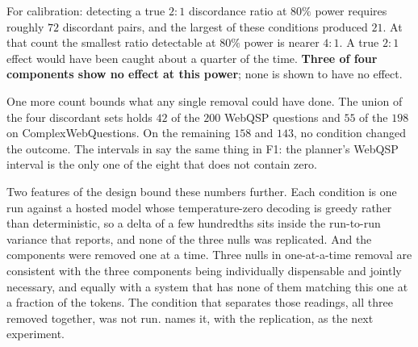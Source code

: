 For calibration: detecting a true $2{:}1$ discordance ratio at $80\%$
power requires roughly $72$ discordant pairs, and the largest of these
conditions produced $21$. At that count the smallest ratio detectable at
$80\%$ power is nearer $4{:}1$. A true $2{:}1$ effect would have been
caught about a quarter of the time. \textbf{Three of four components
show no effect at this power}; none is shown to have no effect.

One more count bounds what any single removal could have done. The union
of the four discordant sets holds $42$ of the $200$ WebQSP questions and
$55$ of the $198$ on ComplexWebQuestions. On the remaining $158$ and
$143$, no condition changed the outcome. The intervals in
 say the same thing in F1: the planner's WebQSP
interval is the only one of the eight that does not contain zero.

Two features of the design bound these numbers further. Each condition
is one run against a hosted model whose temperature-zero decoding is
greedy rather than deterministic, so a delta of a few hundredths sits
inside the run-to-run variance that 
reports, and none of the three nulls was replicated. And the components
were removed one at a time. Three nulls in one-at-a-time removal are
consistent with the three components being individually dispensable and
jointly necessary, and equally with a system that has none of them
matching this one at a fraction of the tokens. The condition that
separates those readings, all three removed together, was not run.
 names it, with the replication, as the next
experiment.
